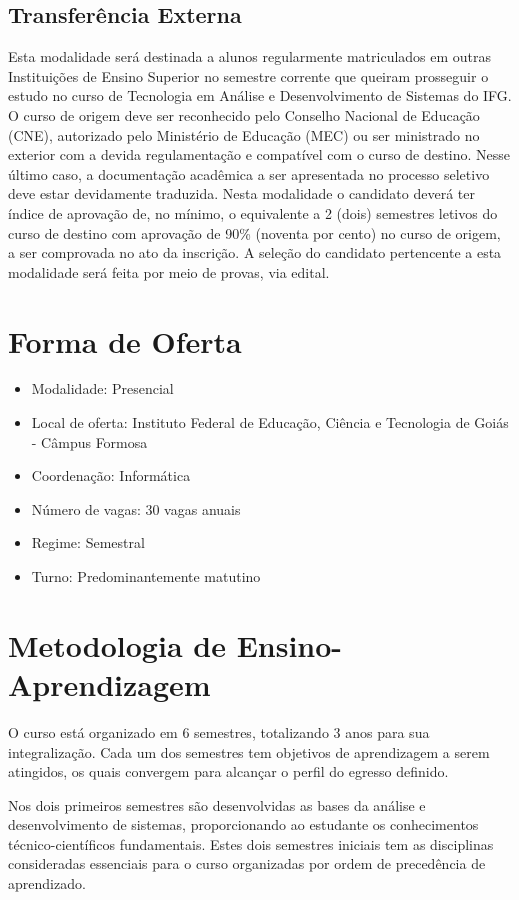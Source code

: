 \documentclass[
	10pt,				%
	openright,			%
	twoside,			%
	a4paper,			%
	english,			%
	french,				%
	brazil,				%
	sumario=tradicional
]{abntex2}
\begin{document}
\subsection*{Transferência Externa}
Esta modalidade será destinada a alunos regularmente matriculados em outras Instituições de Ensino Superior no semestre corrente que queiram prosseguir o estudo no curso de Tecnologia em Análise e Desenvolvimento de Sistemas do IFG. 
O curso de origem deve ser reconhecido pelo Conselho Nacional de Educação (CNE), autorizado pelo Ministério de Educação (MEC) ou ser ministrado no exterior com a devida regulamentação e compatível com o curso de destino. 
Nesse último caso, a documentação acadêmica a ser apresentada no processo seletivo deve estar devidamente traduzida.
Nesta modalidade o candidato deverá ter índice de aprovação de, no mínimo, o equivalente a 2 (dois) semestres letivos do curso de destino com aprovação de 90\% (noventa por cento) no curso de origem, a ser comprovada no ato da inscrição.
A seleção do candidato pertencente a esta modalidade será feita por meio de provas, via edital.

\section*{Forma de Oferta}\label{carga}
\begin{itemize}
	\item Modalidade: Presencial
	\item Local de oferta: Instituto Federal de Educação, Ciência e Tecnologia de Goiás - Câmpus Formosa
	\item Coordenação: Informática
	\item Número de vagas: 30 vagas anuais
	\item Regime: Semestral
	\item Turno: Predominantemente matutino
\end{itemize}

\section*{Metodologia de Ensino-Aprendizagem}\label{metodologia}

O curso está organizado em 6 semestres, totalizando 3 anos para sua integralização.
Cada um dos semestres tem objetivos de aprendizagem a serem atingidos, os quais convergem para alcançar o perfil do egresso definido.

Nos dois primeiros semestres são desenvolvidas as bases da análise e desenvolvimento de sistemas, proporcionando ao estudante os conhecimentos técnico-científicos fundamentais.
Estes dois semestres iniciais tem as disciplinas consideradas essenciais para o curso organizadas por ordem de precedência de aprendizado.
\end{document}
